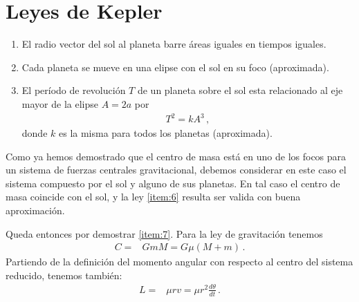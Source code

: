 
\section{Leyes de Kepler}

\begin{frame}
\begin{enumerate}
\item El radio vector del sol al planeta barre áreas iguales en tiempos iguales.
\item Cada planeta se mueve en una elipse con el sol en su foco (aproximada).
\label{item:6}
\item El período de revolución $T$ de un planeta sobre el sol esta relacionado al eje mayor de la elipse $A=2a$ por
  \begin{align}
    T^2=k A^3\,,
  \end{align}
donde $k$ es la misma para todos los planetas (aproximada).
\label{item:7}
\end{enumerate}
\end{frame}

Como ya hemos demostrado que el centro de masa está en uno de los focos para un sistema de fuerzas centrales gravitacional, debemos considerar en este caso el sistema compuesto por el sol y alguno de sus planetas. En tal caso el centro de masa coincide con el sol, y la ley \ref{item:6} resulta ser valida con buena aproximación. 

Queda entonces por demostrar \ref{item:7}. Para la ley de gravitación tenemos
\begin{align}
    C=&GmM=G\mu(M+m)\,.
\end{align}
Partiendo de la definición del momento angular con respecto al centro del sistema reducido, tenemos también:
\begin{align}
  L=&\mu r v=\mu r^2 \frac{d\theta}{dt}\,.
\end{align}

